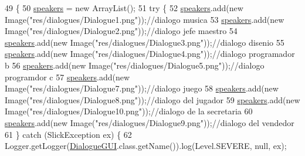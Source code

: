 \begin{DoxyCode}
49                           \{
50         \mbox{\hyperlink{classgui_1_1_dialogue_g_u_i_a11fc12409bfacfca3a0544bd49a75035}{speakers}} = \textcolor{keyword}{new} ArrayList();
51         \textcolor{keywordflow}{try} \{
52             \mbox{\hyperlink{classgui_1_1_dialogue_g_u_i_a11fc12409bfacfca3a0544bd49a75035}{speakers}}.add(\textcolor{keyword}{new} Image(\textcolor{stringliteral}{"res/dialogues/Dialogue1.png"}));\textcolor{comment}{//dialogo musica}
53             \mbox{\hyperlink{classgui_1_1_dialogue_g_u_i_a11fc12409bfacfca3a0544bd49a75035}{speakers}}.add(\textcolor{keyword}{new} Image(\textcolor{stringliteral}{"res/dialogues/Dialogue2.png"}));\textcolor{comment}{//dialogo jefe maestro}
54             \mbox{\hyperlink{classgui_1_1_dialogue_g_u_i_a11fc12409bfacfca3a0544bd49a75035}{speakers}}.add(\textcolor{keyword}{new} Image(\textcolor{stringliteral}{"res/dialogues/Dialogue3.png"}));\textcolor{comment}{//dialogo disenio}
55             \mbox{\hyperlink{classgui_1_1_dialogue_g_u_i_a11fc12409bfacfca3a0544bd49a75035}{speakers}}.add(\textcolor{keyword}{new} Image(\textcolor{stringliteral}{"res/dialogues/Dialogue4.png"}));\textcolor{comment}{//dialogo programador b}
56             \mbox{\hyperlink{classgui_1_1_dialogue_g_u_i_a11fc12409bfacfca3a0544bd49a75035}{speakers}}.add(\textcolor{keyword}{new} Image(\textcolor{stringliteral}{"res/dialogues/Dialogue5.png"}));\textcolor{comment}{//dialogo programdor c}
57             \mbox{\hyperlink{classgui_1_1_dialogue_g_u_i_a11fc12409bfacfca3a0544bd49a75035}{speakers}}.add(\textcolor{keyword}{new} Image(\textcolor{stringliteral}{"res/dialogues/Dialogue7.png"}));\textcolor{comment}{//dialogo juego}
58             \mbox{\hyperlink{classgui_1_1_dialogue_g_u_i_a11fc12409bfacfca3a0544bd49a75035}{speakers}}.add(\textcolor{keyword}{new} Image(\textcolor{stringliteral}{"res/dialogues/Dialogue8.png"}));\textcolor{comment}{//dialogo del jugador       }
59             \mbox{\hyperlink{classgui_1_1_dialogue_g_u_i_a11fc12409bfacfca3a0544bd49a75035}{speakers}}.add(\textcolor{keyword}{new} Image(\textcolor{stringliteral}{"res/dialogues/Dialogue10.png"}));\textcolor{comment}{//dialogo de la secretaria}
60             \mbox{\hyperlink{classgui_1_1_dialogue_g_u_i_a11fc12409bfacfca3a0544bd49a75035}{speakers}}.add(\textcolor{keyword}{new} Image(\textcolor{stringliteral}{"res/dialogues/Dialogue9.png"}));\textcolor{comment}{//dialogo del vendedor }
61         \} \textcolor{keywordflow}{catch} (SlickException ex) \{
62             Logger.getLogger(\mbox{\hyperlink{classgui_1_1_dialogue_g_u_i_a576d9a1c4f0132c3910dfd5206a4a094}{DialogueGUI}}.class.getName()).log(Level.SEVERE, null, ex);

\end{DoxyCode}
